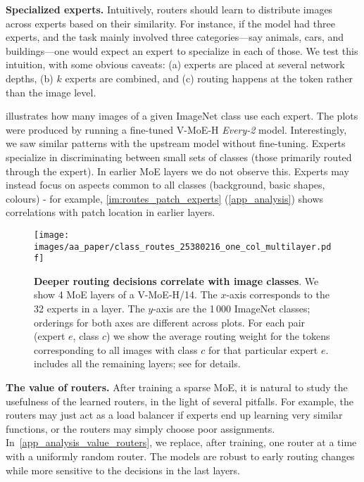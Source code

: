 \documentclass{article}
\newcommand{\abbv}{{V-MoE}}
\begin{document}
\textbf{Specialized experts.}
Intuitively, routers should learn to distribute images across experts based on their similarity.
For instance, if the model had three experts, and the task mainly involved three categories---say animals, cars, and buildings---one would expect an expert to specialize in each of those.
We test this intuition, with some obvious caveats: (a) experts are placed at several network depths, (b) $k$ experts are combined, and (c) routing happens at the token rather than the image level.

 illustrates how many images of a given ImageNet class use each expert. The plots were produced by running a fine-tuned \abbv{}-H \emph{Every-2} model. Interestingly, we saw similar
patterns with the upstream model without fine-tuning.
Experts specialize in discriminating between small sets of classes (those primarily routed through the expert).
In earlier MoE layers we do not observe this. Experts may instead focus on aspects common to all classes (background, basic shapes, colours) - for example, \cref{im:routes_patch_experts} (\cref{app_analysis}) shows correlations with patch location in earlier layers.

\begin{figure}[tb]
\centering
\texttt{[image: images/aa\_paper/class\_routes\_25380216\_one\_col\_multilayer.pdf]}
\caption{\textbf{Deeper routing decisions correlate with image classes}.
We show 4 MoE layers of a \abbv{}-H/14. The $x$-axis corresponds to the 32 experts in a layer. The $y$-axis are the 1\,000 ImageNet classes; orderings for both axes are different across plots.
For each pair (expert $e$, class $c$) we show the average routing weight for the tokens corresponding to all images with class $c$ for that particular expert $e$.  includes all the remaining layers; see  for details.}
\label{im:routes_class_experts}
\end{figure}

\textbf{The value of routers.}
After training a sparse MoE, it is natural to study the usefulness of the learned routers, in the light of several pitfalls.
For example, the routers may just act as a load balancer if experts end up learning very similar functions, or the routers may simply choose poor assignments.
In~\cref{app_analysis_value_routers}, we replace, after training, one router at a time with a uniformly random router.
The models are robust to early routing changes while more sensitive to the decisions in the last layers.
\end{document}
